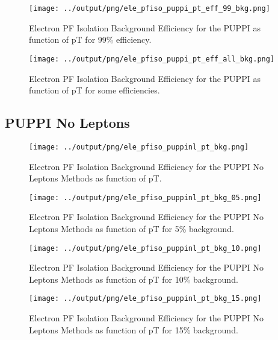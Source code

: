 \documentclass[11pt]{book}
\begin{document}
\begin{figure}[htb]
\centering
\texttt{[image: ../output/png/ele\_pfiso\_puppi\_pt\_eff\_99\_bkg.png]}
\caption{Electron PF Isolation Background Efficiency for the PUPPI as function of pT for 99\% efficiency.}
\label{fig:ele_pfiso_pt_eff_puppi_eff_99_bkg}
\end{figure}

\begin{figure}[htb]
\centering
\texttt{[image: ../output/png/ele\_pfiso\_puppi\_pt\_eff\_all\_bkg.png]}
\caption{Electron PF Isolation Background Efficiency for the PUPPI as function of pT for some efficiencies.}
\label{fig:ele_pfiso_pt_eff_puppi_eff_all_bkg}
\end{figure}
\clearpage

\subsection{PUPPI No Leptons}
\begin{figure}[htb]
\centering
\texttt{[image: ../output/png/ele\_pfiso\_puppinl\_pt\_bkg.png]}
\caption{Electron PF Isolation Background Efficiency for the PUPPI No Leptons Methods as function of pT.}
\label{fig:ele_pfiso_pt_bkg_puppinl}
\end{figure}

\begin{figure}[htb]
\centering
\texttt{[image: ../output/png/ele\_pfiso\_puppinl\_pt\_bkg\_05.png]}
\caption{Electron PF Isolation Background Efficiency for the PUPPI No Leptons Methods as function of pT for 5\% background.}
\label{fig:ele_pfiso_pt_bkg_puppinl_bkg_05}
\end{figure}

\begin{figure}[htb]
\centering
\texttt{[image: ../output/png/ele\_pfiso\_puppinl\_pt\_bkg\_10.png]}
\caption{Electron PF Isolation Background Efficiency for the PUPPI No Leptons Methods as function of pT for 10\% background.}
\label{fig:ele_pfiso_pt_bkg_puppinl_bkg_10}
\end{figure}

\begin{figure}[htb]
\centering
\texttt{[image: ../output/png/ele\_pfiso\_puppinl\_pt\_bkg\_15.png]}
\caption{Electron PF Isolation Background Efficiency for the PUPPI No Leptons Methods as function of pT for 15\% background.}
\label{fig:ele_pfiso_pt_bkg_puppinl_bkg_15}
\end{figure}
\end{document}
